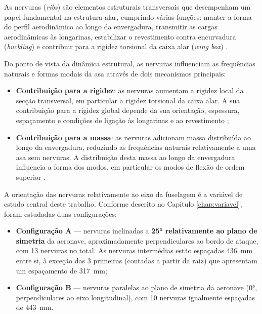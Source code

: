 \documentclass[a4paper,fleqn,noprintline]{cas-dc}
\begin{document}
As nervuras (\textit{ribs}) são elementos estruturais transversais que desempenham um papel fundamental na estrutura alar, cumprindo várias funções: manter a forma do perfil aerodinâmico ao longo da envergadura, transmitir as cargas aerodinâmicas às longarinas, estabilizar o revestimento contra encurvadura (\textit{buckling}) e contribuir para a rigidez torsional da caixa alar (\textit{wing box}) \cite{Megson2012, Niu1988}.

Do ponto de vista da dinâmica estrutural, as nervuras influenciam as frequências naturais e formas modais da asa através de dois mecanismos principais:

\begin{itemize}
    \item \textbf{Contribuição para a rigidez}: as nervuras aumentam a rigidez local da secção transversal, em particular a rigidez torsional da caixa alar. A sua contribuição para a rigidez global depende da sua orientação, espessura, espaçamento e condições de ligação às longarinas e ao revestimento \cite{Niu1988};

    \item \textbf{Contribuição para a massa}: as nervuras adicionam massa distribuída ao longo da envergadura, reduzindo as frequências naturais relativamente a uma asa sem nervuras. A distribuição desta massa ao longo da envergadura influencia a forma dos modos, em particular os modos de flexão de ordem superior \cite{Craig2006}.
\end{itemize}

A orientação das nervuras relativamente ao eixo da fuselagem é a 
variável de estudo central deste trabalho. Conforme descrito no 
Capítulo \ref{chap:variavel}, foram estudadas duas configurações:

\begin{itemize}
    \item \textbf{Configuração A} --- nervuras inclinadas a \textbf{25° relativamente ao plano de simetria} da aeronave, aproximadamente perpendiculares ao bordo de ataque, com 13 nervuras no total. As nervuras intermédias estão espaçadas \SI{436}{\milli\meter} entre si, à exceção das 3 primeiras (contadas a partir da raiz) que apresentam um espaçamento de \SI{317}{\milli\meter};

    \item \textbf{Configuração B} --- nervuras paralelas ao plano de simetria da aeronave (0°, perpendiculares ao eixo longitudinal), com 10 nervuras igualmente espaçadas de \SI{443}{\milli\meter}.
\end{itemize}
\end{document}
